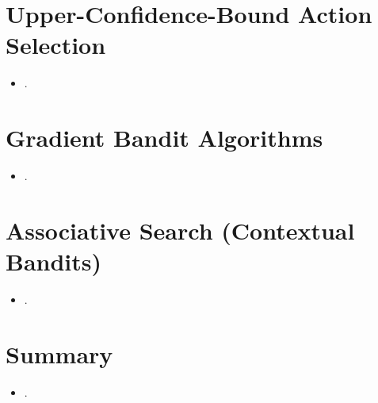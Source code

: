 \documentclass{article}
\begin{document}
\section{Upper-Confidence-Bound Action Selection}
\begin{itemize}
    \item .
\end{itemize}

\section{Gradient Bandit Algorithms}
\begin{itemize}
    \item .
\end{itemize}

\section{Associative Search (Contextual Bandits)}
\begin{itemize}
    \item .
\end{itemize}

\section{Summary}
\begin{itemize}
    \item .
\end{itemize}
\end{document}
